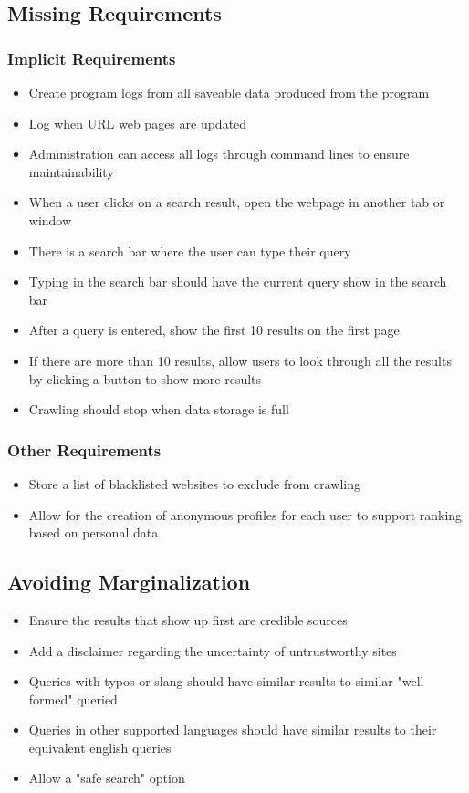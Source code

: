 \subsection*{Missing Requirements}
\subsubsection{Implicit Requirements}
\begin{itemize}
  \item Create program logs from all saveable data produced from the program
  \item Log when URL web pages are updated
  \item Administration can access all logs through command lines to ensure maintainability
  \item When a user clicks on a search result, open the webpage in another tab or window
  \item There is a search bar where the user can type their query
  \item Typing in the search bar should have the current query show in the search bar
  \item After a query is entered, show the first 10 results on the first page
  \item If there are more than 10 results, allow users to look through all the results by clicking a button to show more results
  \item Crawling should stop when data storage is full
\end{itemize}
\subsubsection{Other Requirements}
\begin{itemize}
  \item Store a list of blacklisted websites to exclude from crawling
  \item Allow for the creation of anonymous profiles for each user to support ranking based on personal data
\end{itemize}

\subsection*{Avoiding Marginalization}
\begin{itemize}
  \item Ensure the results that show up first are credible sources
  \item Add a disclaimer regarding the uncertainty of untrustworthy sites
  \item Queries with typos or slang should have similar results to similar "well formed" queried
  \item Queries in other supported languages should have similar results to their equivalent english queries
  \item Allow a "safe search" option
\end{itemize}